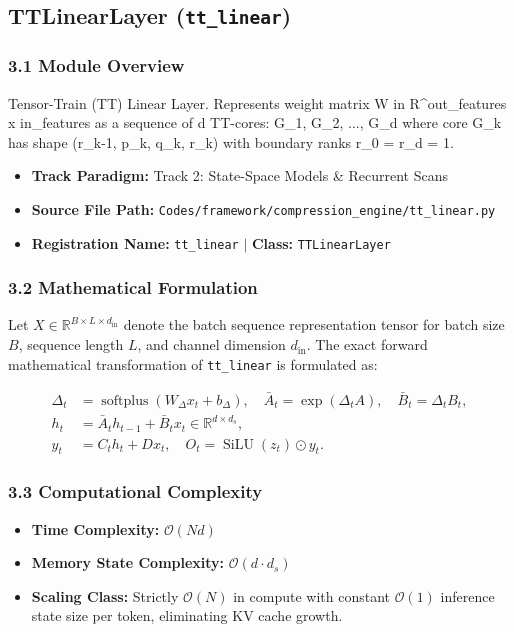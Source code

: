 \subsection{TTLinearLayer (\texttt{tt\_linear})}
\label{sec:app_module_tt_linear}

\subsubsection*{3.1 Module Overview}
Tensor-Train (TT) Linear Layer. Represents weight matrix W in R^{out\_features x in\_features} as a sequence of d TT-cores: G\_1, G\_2, ..., G\_d where core G\_k has shape (r\_{k-1}, p\_k, q\_k, r\_k) with boundary ranks r\_0 = r\_d = 1.
\begin{itemize}
    \item \textbf{Track Paradigm:} Track 2: State-Space Models & Recurrent Scans
    \item \textbf{Source File Path:} \texttt{Codes/framework/compression\_engine/tt\_linear.py}
    \item \textbf{Registration Name:} \texttt{tt\_linear} $\mid$ \textbf{Class:} \texttt{TTLinearLayer}
\end{itemize}

\subsubsection*{3.2 Mathematical Formulation}
Let $X \in \mathbb{R}^{B \times L \times d_{\text{in}}}$ denote the batch sequence representation tensor for batch size $B$, sequence length $L$, and channel dimension $d_{\text{in}}$. The exact forward mathematical transformation of \texttt{tt\_linear} is formulated as:

\begin{align}
\Delta_t &= \operatorname{softplus}(W_\Delta x_t + b_\Delta), \quad \bar{A}_t = \exp(\Delta_t A), \quad \bar{B}_t = \Delta_t B_t, \\
h_t &= \bar{A}_t h_{t-1} + \bar{B}_t x_t \in \mathbb{R}^{d \times d_s}, \\
y_t &= C_t h_t + D x_t, \quad O_t = \operatorname{SiLU}(z_t) \odot y_t.
\end{align}


\subsubsection*{3.3 Computational Complexity}
\begin{itemize}
    \item \textbf{Time Complexity:} $\mathcal{O}(N d)$
    \item \textbf{Memory State Complexity:} $\mathcal{O}(d \cdot d_s)$
    \item \textbf{Scaling Class:} Strictly $\mathcal{O}(N)$ in compute with constant $\mathcal{O}(1)$ inference state size per token, eliminating KV cache growth.
\end{itemize}

